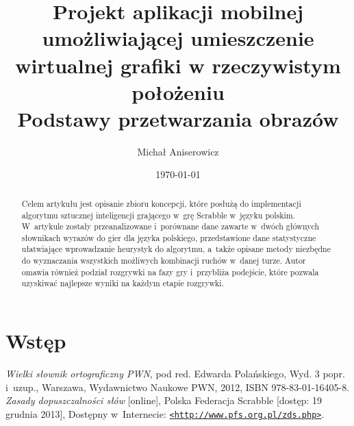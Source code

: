 \documentclass[a4paper,twocolumn,12pt]{article}
\title{
 \LARGE{Projekt aplikacji mobilnej umożliwiającej umieszczenie wirtualnej grafiki w rzeczywistym położeniu} 
 \\ \vspace{2mm} 
 \large{Podstawy przetwarzania obrazów}
}
\author{Michał Aniserowicz}
\date{\today}
\begin{document}
\maketitle

\begin{abstract}
Celem artykułu jest opisanie zbioru koncepcji, które posłużą do implementacji algorytmu sztucznej inteligencji grającego w~grę Scrabble w~języku polskim. W~artykule zostały przeanalizowane i~porównane dane zawarte w~dwóch głównych słownikach wyrazów do gier dla języka polskiego, przedstawione dane statystyczne ułatwiające wprowadzanie heurystyk do algorytmu, a~także opisane metody niezbędne do wyznaczania wszystkich możliwych kombinacji ruchów w~danej turze. Autor omawia również podział rozgrywki na fazy gry i~przybliża podejście, które pozwala uzyskiwać najlepsze wyniki na każdym etapie rozgrywki.
\end{abstract}

\section*{Wstęp}


\begin{thebibliography}{9}
 \small
  \emph{Wielki słownik ortograficzny PWN}, pod red. Edwarda Polańskiego, Wyd. 3 popr. i~uzup., Warszawa, Wydawnictwo Naukowe PWN, 2012, ISBN 978-83-01-16405-8.
  \emph{Zasady dopuszczalności słów} [online], Polska Federacja Scrabble [dostęp: 19 grudnia 2013], Dostępny w~Internecie: \href{http://www.pfs.org.pl/zds.php}{\nolinkurl{<http://www.pfs.org.pl/zds.php>}}.
\end{thebibliography}
\end{document}
